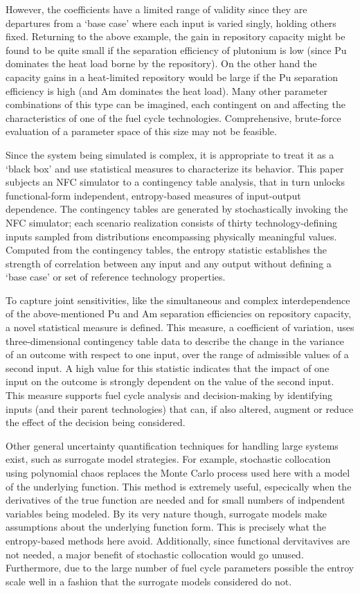 \documentclass[preprint,12pt]{elsarticle}
\begin{document}
However, the coefficients have a limited range of validity since they are departures from a
`base case' where each input is varied singly, holding others fixed.  Returning to the above example,
the gain in repository capacity might be found to be quite small if the separation efficiency
of plutonium is low (since Pu dominates the heat load borne by the repository). 
On the other hand the capacity gains in a heat-limited repository would be large
if the Pu separation efficiency is high (and Am dominates the heat load).  Many other
parameter combinations of this type can be imagined, each contingent on and affecting 
the characteristics of one of the fuel cycle technologies.  Comprehensive,
brute-force evaluation of a parameter space of this size may not be feasible.

Since the system being simulated is complex, it is appropriate to treat it as a `black box'
and use statistical measures to characterize its behavior.  This paper subjects an NFC simulator
to a contingency table analysis, that in turn unlocks functional-form independent, entropy-based
measures of input-output dependence.  The contingency tables are generated by stochastically invoking
the NFC simulator; each scenario realization consists of thirty technology-defining inputs sampled
from distributions encompassing physically meaningful values.  Computed from the contingency tables,
the entropy statistic establishes the strength of correlation between any input and any output
without defining a `base case' or set of reference technology properties.

To capture joint sensitivities, like the simultaneous and complex interdependence of the
above-mentioned Pu and Am separation efficiencies on repository capacity, a novel statistical
measure is defined.  This measure, a coefficient of variation, uses three-dimensional contingency
table data to describe the change in the variance of an outcome with respect to one input, over the
range of admissible values of a second input.  A high value for this statistic indicates that the
impact of one input on the outcome is strongly dependent on the value of the second input.  This
measure supports fuel cycle analysis and decision-making by identifying inputs (and their
parent technologies) that can, if also altered, augment or reduce the effect of the decision
being considered.

Other general uncertainty quantification techniques for handling large systems 
exist, such as surrogate model strategies.  For example, stochastic collocation 
\cite{Mathelin03} using polynomial chaos replaces the Monte Carlo 
process used here with a model of the underlying function.  This method is extremely
useful, especically when the derivatives of the true function are needed and 
for small numbers of indpendent variables being modeled.  By its very nature though, 
surrogate models make assumptions about the underlying function form.  This is 
precisely what the entropy-based methods here avoid.  Additionally, since functional
dervitavives are not needed, a major benefit of stochastic collocation would go
unused.  Furthermore, due to the large number of fuel cycle parameters possible
the entroy scale well in a fashion that the surrogate models considered do not.
\end{document}
